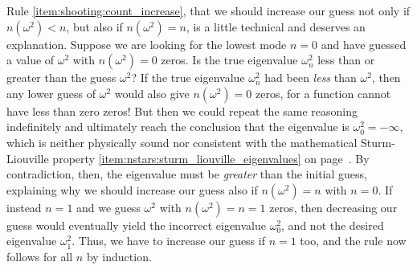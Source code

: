 Rule \ref{item:shooting:count_increase}, that we should increase our guess not only if $n(\omega^2) < n$, but also if $n(\omega^2) = n$, is a little technical and deserves an explanation.
Suppose we are looking for the lowest mode $n = 0$ and have guessed a value of $\omega^2$ with $n(\omega^2) = 0$ zeros.
Is the true eigenvalue $\omega_n^2$ less than or greater than the guess $\omega^2$?
If the true eigenvalue $\omega_n^2$ had been \emph{less} than $\omega^2$, then any lower guess of $\omega^2$ would also give $n(\omega^2) = 0$ zeros, for a function cannot have less than zero zeros!
But then we could repeat the same reasoning indefinitely and ultimately reach the conclusion that the eigenvalue is $\omega_0^2 = -\infty$, which is neither physically sound nor consistent with the mathematical Sturm-Liouville property \ref{item:nstars:sturm_liouville_eigenvalues} on page~\pageref{item:nstars:sturm_liouville_eigenvalues}.
By contradiction, then, the eigenvalue must be \emph{greater} than the initial guess, explaining why we should increase our guess also if $n(\omega^2) = n$ with $n = 0$.
If instead $n = 1$ and we guess $\omega^2$ with $n(\omega^2) = n = 1$ zeros, then decreasing our guess would eventually yield the incorrect eigenvalue $\omega_0^2$, and not the desired eigenvalue $\omega_1^2$.
Thus, we have to increase our guess if $n=1$ too, and the rule now follows for all $n$ by induction.

